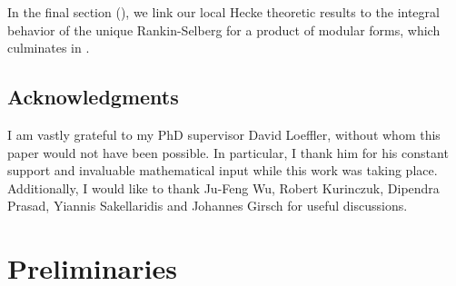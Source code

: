 \documentclass{amsart}%
\theoremstyle{plain}
\theoremstyle{plain}
\theoremstyle{remark}
\begin{document}
In the final section (), we link our local Hecke theoretic results to the integral behavior of the unique Rankin-Selberg for a product of modular forms, which culminates in .
\subsection{Acknowledgments}
I am vastly grateful to my PhD supervisor David Loeffler, without whom this paper would not have been possible. In particular, I thank him for his constant support and invaluable mathematical input while this work was taking place. Additionally, I would like to thank Ju-Feng Wu, Robert Kurinczuk,  Dipendra Prasad, Yiannis Sakellaridis and Johannes Girsch for useful discussions. 
 
{
  \hypersetup{linkcolor=black}
  \tableofcontents
}\section{Preliminaries}\label{sec prelims}
\end{document}
